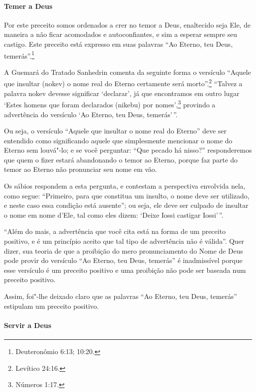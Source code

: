 \begin{multicols}{2}
\paragraph{Temer a Deus}

Por este preceito somos ordenados a crer no temor a Deus, enaltecido
seja Ele, de maneira a não ficar acomodados e autoconfiantes, e sim a
esperar sempre seu castigo. Este preceito está expresso em suas
palavras ``Ao Eterno, teu Deus, temerás''.\footnote{Deuteronômio 6:13; 10:20.}

A Guemará\starr{} do Tratado Sanhedrin\starr{} comenta da seguinte forma o versículo
``Aquele que insultar (nokev\starr) o nome real do Eterno certamente
será morto''.\footnote{Levítico 24:16.} ``Talvez a palavra nokev\starr{} devesse
significar `declarar', já que encontramos em outro lugar `Estes homens
que foram declarados (nikebu\starr) por nomes',\footnote{Números 1:17.} provindo a advertência do versículo `Ao Eterno, teu Deus, temerás'\,''. 

Ou seja, o versículo ``Aquele que insultar o nome real do Eterno'' deve ser
entendido como significando aquele que simplesmente mencionar o nome do
Eterno sem louvá"-lo; e se você perguntar: ``Que pecado há nisso?'' responderemos que quem o fizer estará abandonando o temor
ao Eterno, porque faz parte do temor ao Eterno não pronunciar seu nome
em vão.

Os sábios respondem a esta pergunta, e contestam a perspectiva envolvida
nela, como segue: ``Primeiro, para que constitua um insulto, o nome deve
ser utilizado, e neste caso essa condição está ausente''; ou seja, ele
deve ser culpado de insultar o nome em nome d'Ele, tal como eles dizem:
`Deixe Iossi\starr{} castigar Iossi\starr'\,''.

``Além do mais, a advertência que você cita está na forma de um preceito
positivo, e é um princípio aceito que tal tipo de advertência não é
válida''. Quer dizer, sua teoria de que a proibição do mero
pronunciamento do Nome de Deus pode provir do versículo ``Ao Eterno, teu
Deus, temerás'' é inadmissível porque esse versículo é um preceito
positivo e uma proibição não pode ser baseada num preceito positivo.

Assim, foi"-lhe deixado claro que as palavras ``Ao Eterno, teu Deus,
temerás'' estipulam um preceito positivo.

\paragraph{Servir a Deus}


\end{multicols}
